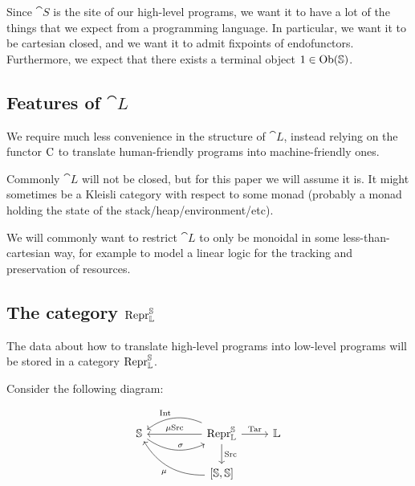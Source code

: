 Since $\cat S$ is the site of our high-level programs, we want it to have a lot
of the things that we expect from a programming language. In particular, we
want it to be cartesian closed, and we want it to admit fixpoints of
endofunctors. Furthermore, we expect that there exists a terminal object $1 \in
  \mathrm{Ob}(\mathbb S)$.

\subsection{Features of $\cat L$}

We require much less convenience in the structure of $\cat L$, instead relying
on the functor $\mathrm C$ to translate human-friendly programs into
machine-friendly ones.

Commonly $\cat L$ will not be closed, but for this paper we will assume it is.
It might sometimes be a Kleisli category with respect to some monad (probably a
monad holding the state of the stack/heap/environment/etc).

We will commonly want to restrict $\cat L$ to only be monoidal in some
less-than-cartesian way, for example to model a linear logic for the tracking
and preservation of resources.

\subsection{The category $\mathrm{Repr} _{\mathbb L} ^{\mathbb S}$}

The data about how to translate high-level programs into low-level programs
will be stored in a category $\mathrm{Repr} _{\mathbb L} ^{\mathbb S}$.

Consider the following diagram:

\begin{equation}
  \begin{tikzcd}
    \cat S \arrow[r, bend right, "\sigma"]
    & [25pt] \Repr _{\cat L} ^{\cat S} \arrow[l, bend right, swap, "\fun {Int}"] \arrow[l, swap, "\mu \fun {Src}"] \arrow[r, "\fun {Tar}"] \arrow[d, "\fun {Src}"]
    & \cat L \\
    & {[\cat S, \cat S]} \arrow[ul, bend left, "\mu"] &
  \end{tikzcd}
\end{equation}

